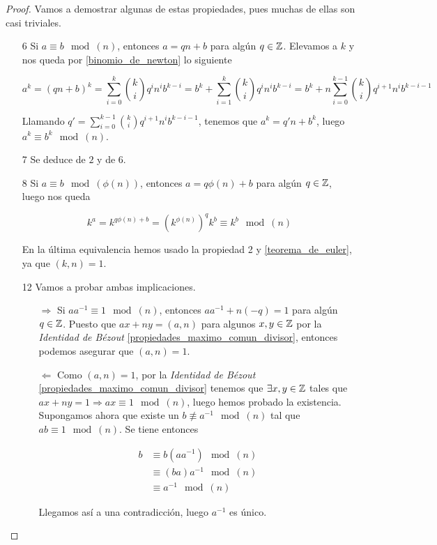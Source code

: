 \begin{proof}
	Vamos a demostrar algunas de estas propiedades, pues muchas de ellas son casi triviales.
	
	\begin{itemize}
		\item[6] Si $a \equiv b \mod(n)$, entonces $a = qn + b$ para algún $q \in \mathbb{Z}$. Elevamos a $k$ y nos queda por \autoref{binomio_de_newton} lo siguiente
		
		\[ a^k = (qn + b)^k = \sum_{i=0}^{k}\binom{k}{i}q^in^ib^{k-i} = b^k + \sum_{i=1}^{k}\binom{k}{i}q^in^ib^{k-i} = b^k + n\sum_{i=0}^{k-1}\binom{k}{i}q^{i+1}n^ib^{k-i-1} \]
		
		Llamando $q' = \sum_{i=0}^{k-1}\binom{k}{i}q^{i+1}n^ib^{k-i-1}$, tenemos que $a^k = q'n + b^k$, luego $a^k \equiv b^k \mod(n)$.
		
		\item[7] Se deduce de $2$ y de $6$.
		
		\item[8] Si $a \equiv b \mod(\phi(n))$, entonces $a = q\phi(n) + b$ para algún $q \in \mathbb{Z}$, luego nos queda
		
		\begin{equation}
		k^a = k^{q\phi(n) + b} = \left(k^{\phi(n)}\right)^qk^b \equiv k^b \mod(n)
		\end{equation} 
		
		En la última equivalencia hemos usado la propiedad 2 y \autoref{teorema_de_euler}, ya que $(k, n) = 1$.
		
		\item[12] Vamos a probar ambas implicaciones.
		
		\begin{itemize}
			\item[$\Rightarrow$] Si $aa^{-1} \equiv 1 \mod(n)$, entonces $aa^{-1} + n(-q) = 1$ para algún $q \in \mathbb{Z}$. Puesto que $ax+ny = (a, n)$ para algunos $x, y \in \mathbb{Z}$ por la \textit{Identidad de Bézout} \autoref{propiedades_maximo_comun_divisor}, entonces podemos asegurar que $(a, n) = 1$.
			
			\item[$\Leftarrow$] Como $(a, n) = 1$, por la \textit{Identidad de Bézout} \autoref{propiedades_maximo_comun_divisor} tenemos que $\exists x,y \in \mathbb{Z}$ tales que $ax + ny = 1 \Rightarrow ax \equiv 1 \mod(n)$, luego hemos probado la existencia.\\
			
			Supongamos ahora que existe un $b \not\equiv a^{-1} \mod(n)$ tal que $ab \equiv 1 \mod(n)$. Se tiene entonces
			
			\begin{align}
			b &\equiv b(aa^{-1}) \mod(n)\\
			&\equiv (ba)a^{-1} \mod(n)\\
			&\equiv a^{-1} \mod(n)
			\end{align}
			
			Llegamos así a una contradicción, luego $a^{-1}$ es único.
		\end{itemize}
	\end{itemize}
\end{proof}

